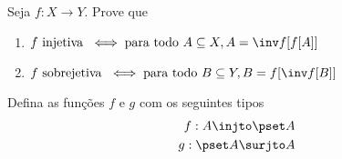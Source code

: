 \begin{exercise}
    Seja $f : X \to Y$. Prove que
    \begin{enumerate}[1)]
        \item $f\text{ injetiva }\iff \text{para todo }A \subseteq X, A = \inv
            f[f[A]]$
        \item $f\text{ sobrejetiva }\iff \text{para todo }B \subseteq Y, B =
            f[\inv f[B]]$
    \end{enumerate}
\end{exercise}

\begin{exercise}
    Defina as funções $f$ e $g$ com os seguintes tipos
    \begin{align*}
        f : A \injto \pset A \\
        g : \pset A \surjto A
    \end{align*}
\end{exercise}
